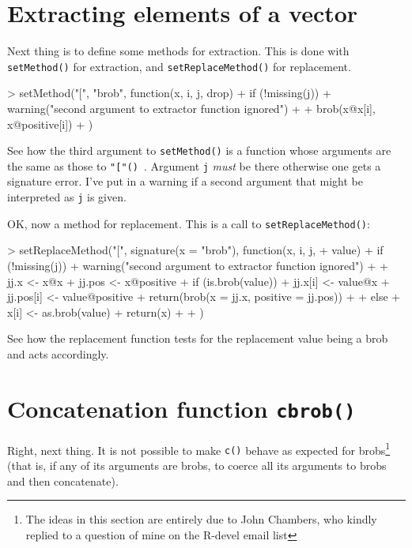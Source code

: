 \documentclass[a4paper]{article}
\begin{document}
\section{Extracting elements of a vector}

Next thing is to define some methods for extraction.  This is done
with {\tt setMethod()} for extraction, and {\tt setReplaceMethod()}
for replacement.

\begin{Schunk}
\begin{Sinput}
> setMethod("[", "brob", function(x, i, j, drop) {
+     if (!missing(j)) {
+         warning("second argument to extractor function ignored")
+     }
+     brob(x@x[i], x@positive[i])
+ })
\end{Sinput}
\end{Schunk}

See how the third argument to {\tt setMethod()} is a function whose
arguments are the same as those to {\tt  "["() %
}.  Argument {\tt j} {\em must} be there otherwise one gets a
  signature error.  I've put in a warning if a second argument that
  might be interpreted as {\tt j} is given.

OK, now a method for replacement.  This is a call to {\tt setReplaceMethod()}:


\begin{Schunk}
\begin{Sinput}
> setReplaceMethod("[", signature(x = "brob"), function(x, i, j, 
+     value) {
+     if (!missing(j)) {
+         warning("second argument to extractor function ignored")
+     }
+     jj.x <- x@x
+     jj.pos <- x@positive
+     if (is.brob(value)) {
+         jj.x[i] <- value@x
+         jj.pos[i] <- value@positive
+         return(brob(x = jj.x, positive = jj.pos))
+     }
+     else {
+         x[i] <- as.brob(value)
+         return(x)
+     }
+ })
\end{Sinput}
\end{Schunk}


See how the replacement function tests for the replacement value being
a brob and acts accordingly.


\section{Concatenation function {\tt cbrob()}}
\label{cbrob}

Right, next thing.  It is not possible to make {\tt c()} behave as
expected for brobs\footnote{The ideas in this section are entirely due
to John Chambers, who kindly replied to a question of mine on the
R-devel email list} (that is, if any of its arguments are brobs, to
coerce all its arguments to brobs and then concatenate).
\end{document}
